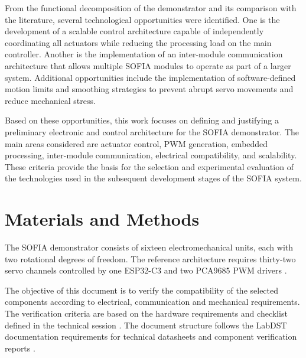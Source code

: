 \documentclass[lettersize,journal]{IEEEtran}
\begin{document}
	From the functional decomposition of the demonstrator and its comparison with
	the literature, several technological opportunities were identified. One is
	the development of a scalable control architecture capable of independently
	coordinating all actuators while reducing the processing load on the main
	controller. Another is the implementation of an inter-module communication
	architecture that allows multiple SOFIA modules to operate as part of a larger
	system. Additional opportunities include the implementation of
	software-defined motion limits and smoothing strategies to prevent abrupt
	servo movements and reduce mechanical stress.
	
	Based on these opportunities, this work focuses on defining and justifying a
	preliminary electronic and control architecture for the SOFIA demonstrator.
	The main areas considered are actuator control, PWM generation, embedded
	processing, inter-module communication, electrical compatibility, and
	scalability. These criteria provide the basis for the selection and
	experimental evaluation of the technologies used in the subsequent development
	stages of the SOFIA system.
	
	\section{Materials and Methods}
	\label{sec:methods}
	
	The SOFIA demonstrator consists of sixteen electromechanical units,
	each with two rotational degrees of freedom. The reference architecture
	requires thirty-two servo channels controlled by one ESP32-C3 and two
	PCA9685 PWM drivers \cite{sofia_architecture}.
	
	The objective of this document is to verify the compatibility of the
	selected components according to electrical, communication and
	mechanical requirements.
	The verification criteria are based on the hardware requirements and
	checklist defined in the technical session \cite{technical_session}.
	The document structure follows the LabDST documentation requirements for
	technical datasheets and component verification reports \cite{labdst_deliverables}.
	
\end{document}
